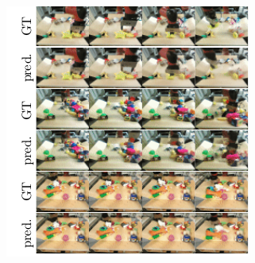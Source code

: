 \begin{figure}[t]
\centering
\includegraphics[width=.8\columnwidth,trim={3.2mm 0 0 0},clip]{images_rfr/video_prediction.pdf}
\caption{\small{}}
\label{fig:video_prediction}
\end{figure}


